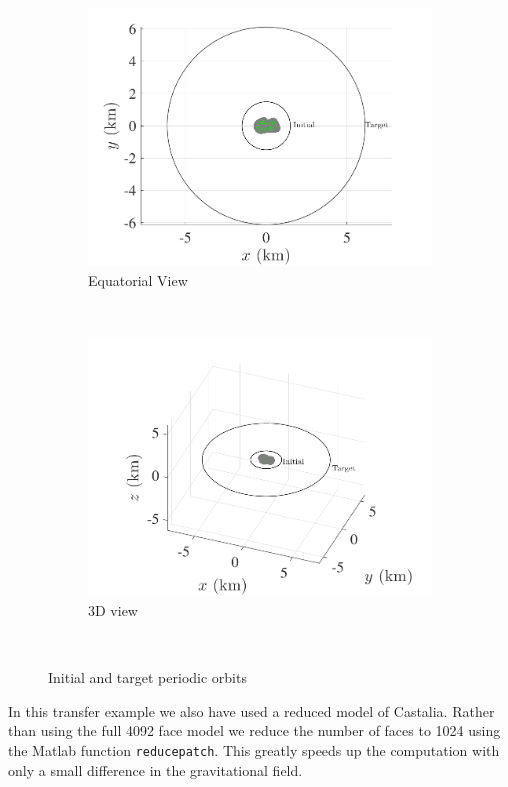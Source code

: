 \documentclass[]{aiaa-tc}%
\begin{document}
\begin{figure}[htbp]
    \centering 
    \begin{subfigure}[htbp]{0.45\textwidth} 
        \includegraphics[width=\textwidth]{initial_transfer} 
        \caption{Equatorial View} \label{fig:eq_initial_transfer} 
    \end{subfigure}~ %
    \begin{subfigure}[htbp]{0.45\textwidth} 
        \includegraphics[width=\textwidth]{initial_transfer_3d} 
        \caption{3D view} \label{fig:initial_transfer_3d} 
    \end{subfigure} ~ %
    \caption{Initial and target periodic orbits}
    \label{fig:initial_transfer} 
\end{figure}
In this transfer example we also have used a reduced model of Castalia.
Rather than using the full \num{4092} face model we reduce the number of faces to \num{1024} using the Matlab function \verb+reducepatch+. 
This greatly speeds up the computation with only a small difference in the gravitational field.
\end{document}
